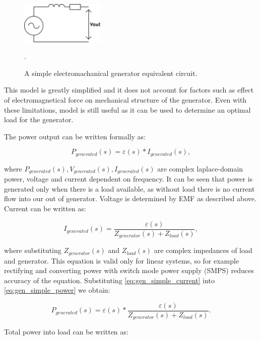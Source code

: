 \begin{figure}[htb]
\begin{center}
\includegraphics[height=2cm]{images/own_dwg/gen_simple}
\end{center}
\caption{A simple electromachanical generator equivalent circuit.}.
\label{gen_simple}
\end{figure}

This model is greatly simplified and it does not account for factors such as effect of electromagnetical force on mechanical structure of the generator. Even with these limitations, model is still useful as it can be used to determine an optimal load for the generator. 

The power output can be written formally as:

\begin{equation} \label{eq:gen_simple_power}
  P_{generated}(s) = \varepsilon(s)*I_{generated}(s),
\end{equation}

where $P_{generated}(s), V_{generated}(s), I_{generated}(s)$ are complex laplace-domain power, voltage and current dependent on frequency. It can be seen that power is generated only when there is a load available, as without load there is no current flow into our out of generator. Voltage is determined by EMF as described above. Current can be written as: 

\begin{equation} \label{eq:gen_simple_current}
  I_{generated}(s) = \frac{\varepsilon(s)}{Z_{generator}(s)+Z_{load}(s)},
\end{equation}

where substituting $Z_{generator}(s) $ and $ Z_{load}(s)$ are complex impedances of load and generator. This equation is valid only for linear systems, so for example rectifying and converting power with switch mode power supply (SMPS) reduces accuracy of the equation. Substituting \eqref{eq:gen_simple_current} into \eqref{eq:gen_simple_power} we obtain:

\begin{equation}
  P_{generated}(s) = \varepsilon(s)*\frac{\varepsilon(s)}{Z_{generator}(s)+Z_{load}(s)}.
\end{equation}

Total power into load can be written as:

